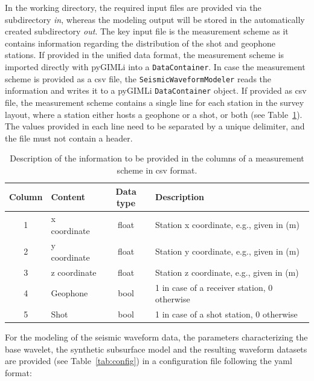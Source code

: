 \documentclass[a4paper,fleqn]{cas-sc}
\begin{document}
In the working directory, the required input files are provided via the subdirectory \textit{in}, whereas the modeling output will be stored in the automatically created subdirectory \textit{out}. The key input file is the measurement scheme as it contains information regarding the distribution of the shot and geophone stations. If provided in the unified data format, the measurement scheme is imported directly with pyGIMLi into a \texttt{DataContainer}. In case the measurement scheme is provided as a csv file, the \texttt{SeismicWaveformModeler} reads the information and writes it to a pyGIMLi \texttt{DataContainer} object. If provided as csv file, the measurement scheme contains a single line for each station in the survey layout, where a station either hosts a geophone or a shot, or both (see Table~\ref{tab:scheme}). The values provided in each line need to be separated by a unique delimiter, and the file must not contain a header.
\begin{table}%
    \caption{Description of the information to be provided in the columns of a measurement scheme in csv format.}
    \centering
    \begin{tabular}{clcl}
        \toprule
        Column & \textbf{Content} & \textbf{Data type} & \textbf{Description} \\
        \midrule
        1 & x coordinate & float & Station x coordinate, e.g., given in (m) \\ 
        2 & y coordinate & float & Station y coordinate, e.g., given in (m) \\ 
        3 & z coordinate & float & Station z coordinate, e.g., given in (m) \\ 
        4 & Geophone & bool & 1 in case of a receiver station, 0 otherwise \\ 
        5 & Shot & bool & 1 in case of a shot station, 0 otherwise \\
        \bottomrule
    \end{tabular}
    \label{tab:scheme}
\end{table}
%

For the modeling of the seismic waveform data, the parameters characterizing the base wavelet, the synthetic subsurface model and the resulting waveform datasets are provided (see Table~\ref{tab:config}) in a configuration file following the yaml format:
\end{document}
